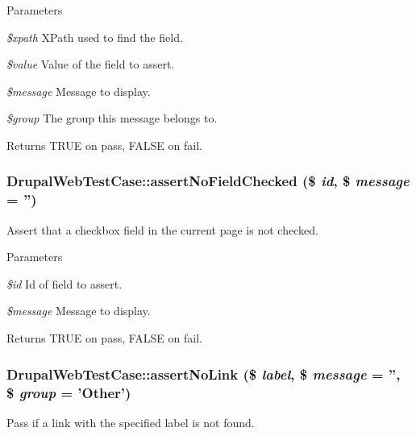 \begin{DoxyParams}{Parameters}
\item[{\em \$xpath}]XPath used to find the field. \item[{\em \$value}]Value of the field to assert. \item[{\em \$message}]Message to display. \item[{\em \$group}]The group this message belongs to. \end{DoxyParams}
\begin{DoxyReturn}{Returns}
TRUE on pass, FALSE on fail. 
\end{DoxyReturn}
\hypertarget{class_drupal_web_test_case_a23fbbe9b681b00419a0023ef07b48067}{
\subsubsection[{assertNoFieldChecked}]{\setlength{\rightskip}{0pt plus 5cm}DrupalWebTestCase::assertNoFieldChecked (\$ {\em id}, \/  \$ {\em message} = {\ttfamily ''})}}
\label{class_drupal_web_test_case_a23fbbe9b681b00419a0023ef07b48067}
Assert that a checkbox field in the current page is not checked.


\begin{DoxyParams}{Parameters}
\item[{\em \$id}]Id of field to assert. \item[{\em \$message}]Message to display. \end{DoxyParams}
\begin{DoxyReturn}{Returns}
TRUE on pass, FALSE on fail. 
\end{DoxyReturn}
\hypertarget{class_drupal_web_test_case_aebe9c02edc5edcf8e0b97d5c9742070b}{
\subsubsection[{assertNoLink}]{\setlength{\rightskip}{0pt plus 5cm}DrupalWebTestCase::assertNoLink (\$ {\em label}, \/  \$ {\em message} = {\ttfamily ''}, \/  \$ {\em group} = {\ttfamily 'Other'})}}
\label{class_drupal_web_test_case_aebe9c02edc5edcf8e0b97d5c9742070b}
Pass if a link with the specified label is not found.


